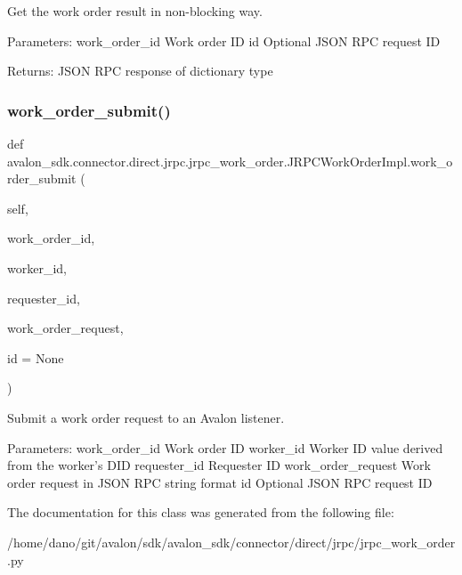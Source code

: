 \begin{DoxyVerb}Get the work order result in non-blocking way.

Parameters:
work_order_id     Work order ID
id                Optional JSON RPC request ID

Returns:
JSON RPC response of dictionary type
\end{DoxyVerb}
 \mbox{\label{classavalon__sdk_1_1connector_1_1direct_1_1jrpc_1_1jrpc__work__order_1_1JRPCWorkOrderImpl_a0abd85babf4a7cd74a197455b5ae288a}} 
\subsubsection{\texorpdfstring{work\+\_\+order\+\_\+submit()}{work\_order\_submit()}}
{\footnotesize\ttfamily def avalon\+\_\+sdk.\+connector.\+direct.\+jrpc.\+jrpc\+\_\+work\+\_\+order.\+J\+R\+P\+C\+Work\+Order\+Impl.\+work\+\_\+order\+\_\+submit (\begin{DoxyParamCaption}\item[{}]{self,  }\item[{}]{work\+\_\+order\+\_\+id,  }\item[{}]{worker\+\_\+id,  }\item[{}]{requester\+\_\+id,  }\item[{}]{work\+\_\+order\+\_\+request,  }\item[{}]{id = {\ttfamily None} }\end{DoxyParamCaption})}

\begin{DoxyVerb}Submit a work order request to an Avalon listener.

Parameters:
work_order_id     Work order ID
worker_id         Worker ID value derived from the worker's DID
requester_id      Requester ID
work_order_request Work order request in JSON RPC string format
id                Optional JSON RPC request ID
\end{DoxyVerb}
 

The documentation for this class was generated from the following file\+:\begin{DoxyCompactItemize}
\item 
/home/dano/git/avalon/sdk/avalon\+\_\+sdk/connector/direct/jrpc/jrpc\+\_\+work\+\_\+order.\+py\end{DoxyCompactItemize}
